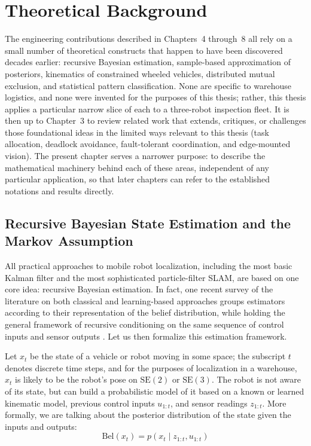 \chapter{Theoretical Background\label{cha:chapter2}}

The engineering contributions described in Chapters~4 through~8 all rely on a small number of theoretical constructs that happen to have been discovered decades earlier: recursive Bayesian estimation, sample-based approximation of posteriors, kinematics of constrained wheeled vehicles, distributed mutual exclusion, and statistical pattern classification. None are specific to warehouse logistics, and none were invented for the purposes of this thesis; rather, this thesis applies a particular narrow slice of each to a three-robot inspection fleet. It is then up to Chapter~3 to review related work that extends, critiques, or challenges those foundational ideas in the limited ways relevant to this thesis (task allocation, deadlock avoidance, fault-tolerant coordination, and edge-mounted vision). The present chapter serves a narrower purpose: to describe the mathematical machinery behind each of these areas, independent of any particular application, so that later chapters can refer to the established notations and results directly.

\section{Recursive Bayesian State Estimation and the Markov Assumption}

All practical approaches to mobile robot localization, including the most basic Kalman filter and the most sophisticated particle-filter SLAM, are based on one core idea: recursive Bayesian estimation. In fact, one recent survey of the literature on both classical and learning-based approaches groups estimators according to their representation of the belief distribution, while holding the general framework of recursive conditioning on the same sequence of control inputs and sensor outputs \cite{ebner2026robot}. Let us then formalize this estimation framework.

Let $x_t$ be the state of a vehicle or robot moving in some space; the subscript $t$ denotes discrete time steps, and for the purposes of localization in a warehouse, $x_t$ is likely to be the robot's pose on $\mathrm{SE}(2)$ or $\mathrm{SE}(3)$. The robot is not aware of its state, but can build a probabilistic model of it based on a known or learned kinematic model, previous control inputs $u_{1:t}$, and sensor readings $z_{1:t}$. More formally, we are talking about the posterior distribution of the state given the inputs and outputs:
\begin{equation}
\mathrm{Bel}(x_t) = p(x_t \mid z_{1:t}, u_{1:t}) \label{eq:belief_definition}
\end{equation}

